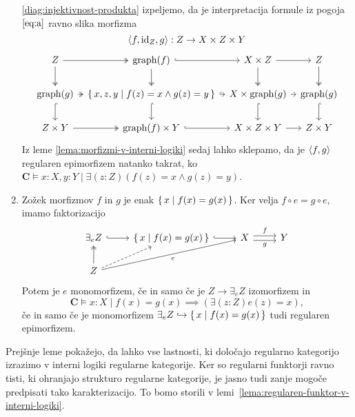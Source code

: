 \documentclass[../kategoricna_logika.tex]{subfiles}
\begin{document}
\begin{dokaz}
\begin{enumerate}[label=(\roman*)]
      \eqref{diag:injektivnost-produkta} izpeljemo, da je
      interpretacija formule iz pogoja $\eqref{eq:a}$ ravno slika morfizma
      \[\langle f, \mathrm{id}_{Z}, g \rangle : Z \to X \times Z \times Y\]
      \begin{equation*}
        \begin{tikzcd}[column sep=tiny]
          Z \ar[d, two heads] \ar[r, two heads] & \mathrm{graph}(f)
          \ar[d, two heads] \ar[r, hook] &
          X \times Z \ar[d, two heads] \ar[r] & Z \ar[d, two heads] \\
          \mathrm{graph}(g) \ar[d, hook] \ar[r, two heads] &
          \set{x,z,y \mid f(z) = x \land g(z) = y} \ar[d, hook] \ar[r,
          hook] & X \times \mathrm{graph}(g) \ar[d, hook] \ar[r] &
          \mathrm{graph}(g) \ar[d, hook] \\
          Z \times Y \ar[r, two heads] & \mathrm{graph}(f) \times Y
          \ar[r, hook] & X \times Z \times Y \ar[r] & Z \times Y
        \end{tikzcd}
      \end{equation*}
      Iz leme \ref{lema:morfizmi-v-interni-logiki} sedaj lahko
      sklepamo, da je $\langle f,g \rangle$ regularen epimorfizem natanko
      takrat, ko
      $\mathbf{C} \models x:X,y:Y \mid \exists (z:Z) (f(z) = x \land g(z) = y)$.
      
    \item Zožek morfizmov $f$ in $g$ je enak
      $\lbrace\,x \mid f(x) = g(x)\,\rbrace$.  Ker velja
      ${f \circ e = g \circ e}$, imamo faktorizacijo
      \begin{equation*}
        \begin{tikzcd}
          \exists_{e}Z \ar[r, hook] & \set{x \mid f(x) = g(x)} \ar[r,
          hook] &
          X \ar[r, shift left, "f"] \ar[r, shift right, "g"'] & Y \\
          Z \ar[u, two heads] \ar[ur, dashed] \ar[urr, "e"']
        \end{tikzcd}
      \end{equation*}
      Potem je $e$ monomorfizem, če in samo če je
      $Z \to \exists_{e}Z$ izomorfizem in
      \[\mathbf{C} \models x:X \mid f(x) = g(x) \implies (\exists (z:Z) e(z) =
        x),\] če in samo če je monomorfizem
      $\exists_{e}Z \hookrightarrow \lbrace\,x \mid f(x) = g(x)\,\rbrace$ tudi
      regularen epimorfizem.\qedhere
    \end{enumerate}
  \end{dokaz}%
  Prejšnje leme pokažejo, da lahko vse lastnosti, ki določajo
  regularno kategorijo izrazimo v interni logiki regularne kategorije.
  Ker so regularni funktorji ravno tisti, ki ohranjajo strukturo regularne
  kategorije, je jasno tudi zanje mogoče predpisati tako karakterizacijo.
  To bomo storili v lemi~\ref{lema:regularen-funktor-v-interni-logiki}.
%
\end{document}
